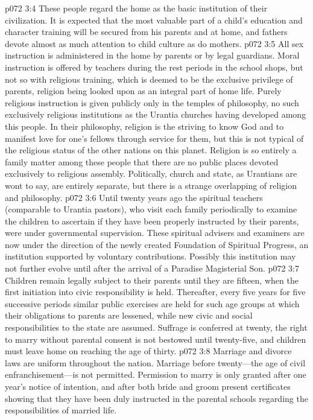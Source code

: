 \pc \vs p072 3:4 These people regard the home as the basic institution of their civilization. It is expected that the most valuable part of a child’s education and character training will be secured from his parents and at home, and fathers devote almost as much attention to child culture as do mothers.
\vs p072 3:5 All sex instruction is administered in the home by parents or by legal guardians. Moral instruction is offered by teachers during the rest periods in the school shops, but not so with religious training, which is deemed to be the exclusive privilege of parents, religion being looked upon as an integral part of home life. Purely religious instruction is given publicly only in the temples of philosophy, no such exclusively religious institutions as the Urantia churches having developed among this people. In their philosophy, religion is the striving to know God and to manifest love for one’s fellows through service for them, but this is not typical of the religious status of the other nations on this planet. Religion is so entirely a family matter among these people that there are no public places devoted exclusively to religious assembly. Politically, church and state, as Urantians are wont to say, are entirely separate, but there is a strange overlapping of religion and philosophy.\plusone
\vs p072 3:6 Until twenty years ago the spiritual teachers (comparable to Urantia pastors), who visit each family periodically to examine the children to ascertain if they have been properly instructed by their parents, were under governmental supervision. These spiritual advisers and examiners are now under the direction of the newly created Foundation of Spiritual Progress, an institution supported by voluntary contributions. Possibly this institution may not further evolve until after the arrival of a Paradise Magisterial Son.
\pc \vs p072 3:7 Children remain legally subject to their parents until they are fifteen, when the first initiation into civic responsibility is held. Thereafter, every five years for five successive periods similar public exercises are held for such age groups at which their obligations to parents are lessened, while new civic and social responsibilities to the state are assumed. Suffrage is conferred at twenty, the right to marry without parental consent is not bestowed until twenty\hyp{}five, and children must leave home on reaching the age of thirty.
\vs p072 3:8 Marriage and divorce laws are uniform throughout the nation. Marriage before twenty---the age of civil enfranchisement---is not permitted. Permission to marry is only granted after one year’s notice of intention, and after both bride and groom present certificates showing that they have been duly instructed in the parental schools regarding the responsibilities of married life.
